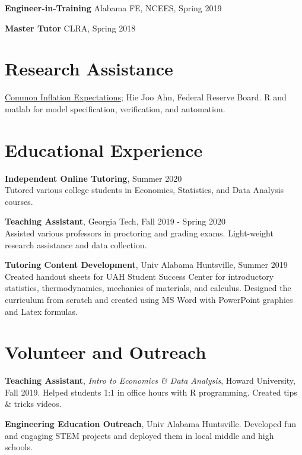 \documentclass[margin,line]{res}
\begin{document}
\begin{resume}
{\bf Engineer-in-Training} Alabama FE, NCEES, Spring 2019
\vspace*{-3mm}

{\bf Master Tutor} CLRA, Spring 2018
\vspace*{-3mm}

\vspace{.75cm}
\section{\sc Research Assistance}
  \href{https://www.federalreserve.gov/econres/notes/feds-notes/research-data-series-index-of-common-inflation-expectations-20210305.htm}{Common Inflation Expectations}; Hie Joo Ahn, Federal Reserve Board. R and matlab for model specification, verification, and automation. 

\vspace{.75cm}
 \section{\sc Educational Experience}

    {\bf Independent Online Tutoring}, Summer 2020\\
    {Tutored various college students in Economics, Statistics, and Data Analysis courses.}

    {\bf Teaching Assistant}, Georgia Tech, Fall 2019 - Spring 2020\\
    {Assisted various professors in proctoring and grading exams. Light-weight research assistance and data collection.}
    
    {\bf Tutoring Content Development}, Univ Alabama Huntsville, Summer 2019\\
    {Created handout sheets for UAH Student Success Center for introductory statistics, thermodynamics, mechanics of materials, and calculus. Designed the curriculum from scratch and created using MS Word with PowerPoint graphics and Latex formulas.}

\vspace{.75cm}
\section{\sc Volunteer and Outreach}

{\bf Teaching Assistant}, {\it Intro to Economics \& Data Analysis}, Howard University, Fall 2019.
{Helped students 1:1 in office hours with R programming. Created tips \& tricks videos.}

{\bf Engineering Education Outreach}, Univ Alabama Huntsville.
{Developed fun and engaging STEM projects and deployed them in local middle and high schools.}


\end{resume}
\end{document}
